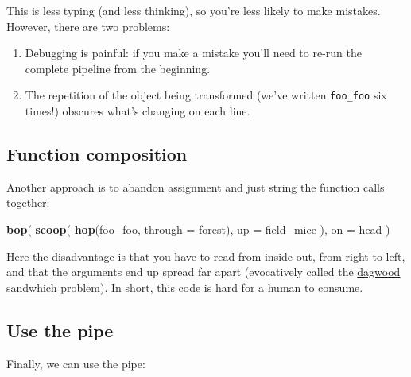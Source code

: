 \documentclass[]{book}
\newenvironment{Shaded}{\begin{snugshade}}{\end{snugshade}}
\newcommand{\KeywordTok}[1]{\textcolor[rgb]{0.13,0.29,0.53}{\textbf{{#1}}}}
\newcommand{\DataTypeTok}[1]{\textcolor[rgb]{0.13,0.29,0.53}{{#1}}}
\newcommand{\StringTok}[1]{\textcolor[rgb]{0.31,0.60,0.02}{{#1}}}
\newcommand{\NormalTok}[1]{{#1}}
\begin{document}
This is less typing (and less thinking), so you're less likely to make
mistakes. However, there are two problems:

\begin{enumerate}
\def\labelenumi{\arabic{enumi}.}
\item
  Debugging is painful: if you make a mistake you'll need to re-run the
  complete pipeline from the beginning.
\item
  The repetition of the object being transformed (we've written
  \texttt{foo\_foo} six times!) obscures what's changing on each line.
\end{enumerate}

\subsection{Function composition}\label{function-composition}

Another approach is to abandon assignment and just string the function
calls together:

\begin{Shaded}
\begin{Highlighting}[]
\KeywordTok{bop}\NormalTok{(}
  \KeywordTok{scoop}\NormalTok{(}
    \KeywordTok{hop}\NormalTok{(foo_foo, }\DataTypeTok{through =} \NormalTok{forest),}
    \DataTypeTok{up =} \NormalTok{field_mice}
  \NormalTok{), }
  \DataTypeTok{on =} \NormalTok{head}
\NormalTok{)}
\end{Highlighting}
\end{Shaded}

Here the disadvantage is that you have to read from inside-out, from
right-to-left, and that the arguments end up spread far apart
(evocatively called the
\href{https://en.wikipedia.org/wiki/Dagwood_sandwich}{dagwood sandwhich}
problem). In short, this code is hard for a human to consume.

\subsection{Use the pipe}\label{use-the-pipe}

Finally, we can use the pipe:

\begin{Shaded}
\end{Shaded}
\end{document}
